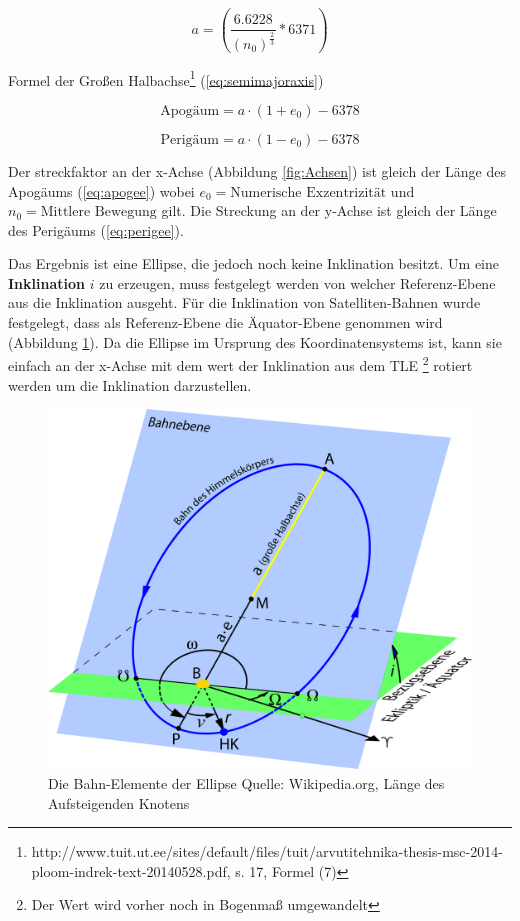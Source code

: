 \begin{equation} \label{eq:semimajoraxis}
  a = \left( \frac{6.6228}{(n_0)^\frac{2}{3}} * 6371 \right)
\end{equation}

Formel der Großen Halbachse\footnote{http://www.tuit.ut.ee/sites/default/files/tuit/arvutitehnika-thesis-msc-2014-ploom-indrek-text-20140528.pdf, s. 17, Formel (7)} (\ref{eq:semimajoraxis})

\begin{equation} \label{eq:apogee}
  \text{Apogäum} = a \cdot (1 + e_0) - 6378
\end{equation}

\begin{equation} \label{eq:perigee}
  \text{Perigäum} = a \cdot (1 - e_0) - 6378
\end{equation}


Der streckfaktor an der x-Achse (Abbildung \ref{fig:Achsen}) ist gleich der Länge des
Apogäums (\ref{eq:apogee}) wobei \( e_0 = \text{Numerische Exzentrizität} \) und 
\( n_0 = \text{Mittlere Bewegung} \) gilt. Die Streckung an der y-Achse ist gleich der Länge des
Perigäums (\ref{eq:perigee}).

Das Ergebnis ist eine Ellipse, die jedoch noch keine Inklination besitzt. Um eine
\textbf{Inklination} \( i \) zu erzeugen, muss festgelegt werden von welcher Referenz-Ebene aus die
Inklination ausgeht. Für die Inklination von Satelliten-Bahnen wurde festgelegt, dass als
Referenz-Ebene die Äquator-Ebene genommen wird (Abbildung \ref{fig:BahnelementeEllipse}). Da
die Ellipse im Ursprung des Koordinatensystems ist, kann sie einfach an der x-Achse mit dem
wert der Inklination aus dem TLE \footnote{Der Wert wird vorher noch in Bogenmaß umgewandelt}
rotiert werden um die Inklination darzustellen.
\\\par

\begin{figure}[h]
  \centering
  \includegraphics[width=120mm]{figs/BahnelementeEllipse}
  \captionsetup{labelformat=parens}
  \caption{Die Bahn-Elemente der Ellipse \newline Quelle: Wikipedia.org, Länge des Aufsteigenden Knotens}
  \label{fig:BahnelementeEllipse}
\end{figure}


